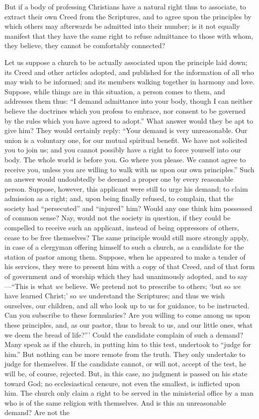 \documentclass[
]{book}
\begin{document}
But if a body of professing Christians have a natural right thus to associate, to extract their own Creed from the Scriptures, and to agree upon the principles by which others may afterwards be admitted into their number; is it not equally manifest that they have the same right to refuse admittance to those with whom, they believe, they cannot be comfortably connected?

Let us suppose a church to be actually associated upon the principle laid down; its Creed and other articles adopted, and published for the information of all who may wish to be informed; and its members walking together in harmony and love. Suppose, while things are in this situation, a person comes to them, and addresses them thus: ``I demand admittance into your body, though I can neither believe the doctrines which you profess to embrace, nor consent to be governed by the rules which you have agreed to adopt.'' What answer would they be apt to give him? They would certainly reply: ``Your demand is very unreasonable. Our union is a voluntary one, for our mutual spiritual benefit. We have not solicited you to join us; and you cannot possibly have a right to force yourself into our body. The whole world is before you. Go where you please. We cannot agree to receive you, unless you are willing to walk with us upon our own principles.'' Such an answer would undoubtedly be deemed a proper one by every reasonable person. Suppose, however, this applicant were still to urge his demand; to claim admission as a right; and, upon being finally refused, to complain, that the society had ``persecuted'' and ``injured'' him? Would any one think him possessed of common sense? Nay, would not the society in question, if they could be compelled to receive such an applicant, instead of being oppressors of others, cease to be free themselves? The same principle would still more strongly apply, in case of a clergyman offering himself to such a church, as a candidate for the station of pastor among them. Suppose, when he appeared to make a tender of his services, they were to present him with a copy of that Creed, and of that form of government and of worship which they had unanimously adopted, and to say---``This is what \emph{we} believe. We pretend not to prescribe to others; `but so \emph{we} have learned Christ;' so \emph{we} understand the Scriptures; and thus we wish ourselves, our children, and all who look up to us for guidance, to be instructed. Can you subscribe to these formularies? Are you willing to come among us upon these principles, and, as our pastor, thus to break to us, and our little ones, what we deem the bread of life?''' Could the candidate complain of such a demand? Many speak as if the church, in putting him to this test, undertook to ``judge for him.'' But nothing can be more remote from the truth. They only undertake to judge for themselves. If the candidate cannot, or will not, accept of the test, he will be, of course, rejected. But, in this case, no judgment is passed on his state toward God; no ecclesiastical censure, not even the smallest, is inflicted upon him. The church only claim a right to be served in the ministerial office by a man who is of the same religion with themselves. And is this an unreasonable demand? Are not the 
\end{document}
